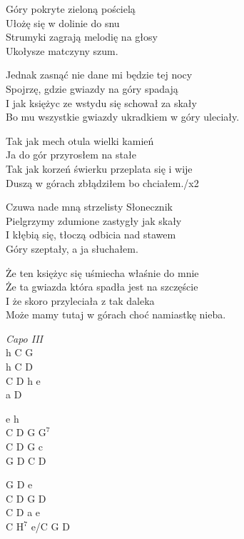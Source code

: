 \begin{text}
    Góry pokryte zieloną pościelą\\
    Ułożę się w dolinie do snu\\
    Strumyki zagrają melodię na głosy\\
    Ukołysze matczyny szum.

    Jednak zasnąć nie dane mi będzie tej nocy\\
    Spojrzę, gdzie gwiazdy na góry spadają\\
    I jak księżyc ze wstydu się schował za skały\\
    Bo mu wszystkie gwiazdy ukradkiem w góry uleciały.

    Tak jak mech otula wielki kamień\\
    Ja do gór przyrosłem na stałe\\
    Tak jak korzeń świerku przeplata się i wije\\
    Duszą w górach zbłądziłem bo chciałem./x2

    Czuwa nade mną strzelisty Słonecznik\\
    Pielgrzymy zdumione zastygły jak skały\\
    I kłębią się, tłoczą odbicia nad stawem\\
    Góry szeptały, a ja słuchałem.

    Że ten księżyc się uśmiecha właśnie do mnie\\
    Że ta gwiazda która spadła jest na szczęście\\
    I że skoro przyleciała z tak daleka\\
    Może mamy tutaj w górach choć namiastkę nieba.
\end{text}
\begin{chord}
    \textit{Capo III}\\
    h C	G\\
    h C	D\\
    C D	h e\\
    a D

    e h\\
    C D	G $\mathrm{G^{7}}$\\
    C D	G c\\
    G D	C D

    G D	e\\
    C D	G D\\
    C D	a e\\
    C $\mathrm{H^{7}}$ e/C G D
\end{chord}

